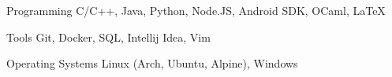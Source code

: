 

\begin{cvskills}

  \cvskill
    {Programming} %
    {C/C++, Java, Python, Node.JS, Android SDK, OCaml, LaTeX} %

  \cvskill
    {Tools} %
    {Git, Docker, SQL, Intellij Idea, Vim} %

  \cvskill
    {Operating Systems} %
    {Linux (Arch, Ubuntu, Alpine), Windows} %


\end{cvskills}
